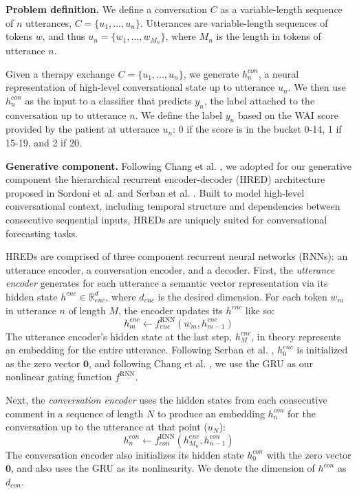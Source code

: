 \documentclass{article}
\begin{document}
\textbf{Problem definition.} We define a conversation $C$ as a variable-length sequence of $n$ utterances, $C=\{u_1,...,u_n\}$. Utterances are variable-length sequences of tokens $w$, and thus $u_n=\{w_1,...,w_{M_n}\}$, where $M_n$ is the length in tokens of utterance $n$.

Given a therapy exchange $C=\{u_1,...,u_n\}$, we generate $h^{con}_n$, a neural representation of high-level conversational state up to utterance $u_n$. We then use $h^{con}_n$ as the input to a classifier that predicts $y_n$, the label attached to the conversation up to utterance $n$. We define the label $y_n$ based on the WAI score provided by the patient at utterance $u_n$: 0 if the score is in the bucket 0-14, 1 if 15-19, and 2 if 20.

\textbf{Generative component.} Following Chang et al. \citeyear{Chang-Trouble:19}, we adopted for our generative component the hierarchical recurrent encoder-decoder (HRED) architecture proposed in Sordoni et al. \citeyear{sordoni2015hierarchical} and Serban et al. \citeyear{serban2016building}. Built to model high-level conversational context, including temporal structure and dependencies between consecutive sequential inputs, HREDs are uniquely suited for conversational forecasting tasks. 

HREDs are comprised of three component recurrent neural networks (RNNs): an utterance encoder, a conversation encoder, and a decoder. First, the \textit{utterance encoder} generates for each utterance a semantic vector representation via its hidden state $h^{enc} \in \mathbb{R}^d_{enc}$, where $d_{enc}$ is the desired dimension. For each token $w_m$ in utterance $n$ of length $M$, the encoder updates its $h^{enc}$ like so:
\begin{equation}
  h^{enc}_m \gets f^{\mathrm{RNN}}_{enc}(w_{m}, h^{enc}_{m-1})
\end{equation}
The utterance encoder's hidden state at the last step, $h^{enc}_{M}$, in theory represents an embedding for the entire utterance. Following Serban et al. \citeyear{serban2016building}, $h^{enc}_{0}$ is initialized as the zero vector $\mathbf{0}$, and following Chang et al. \citeyear{Chang-Trouble:19}, we use the GRU \cite{cho2014learning} as our nonlinear gating function $f^{\mathrm{RNN}}$.

Next, the \textit{conversation encoder} uses the hidden states from each consecutive comment in a sequence of length $N$ to produce an embedding $h^{con}_n$ for the conversation up to the utterance at that point ($u_N$):
\begin{equation}
  h^{con}_n \gets f^{\mathrm{RNN}}_{con}(h^{enc}_{M_n}, h^{con}_{n-1})
\end{equation}
The conversation encoder also initializes its hidden state $h^{con}_0$ with the zero vector $\mathbf{0}$, and also uses the GRU as its nonlinearity. We denote the dimension of $h^{con}$ as $d_{con}$.
\end{document}
